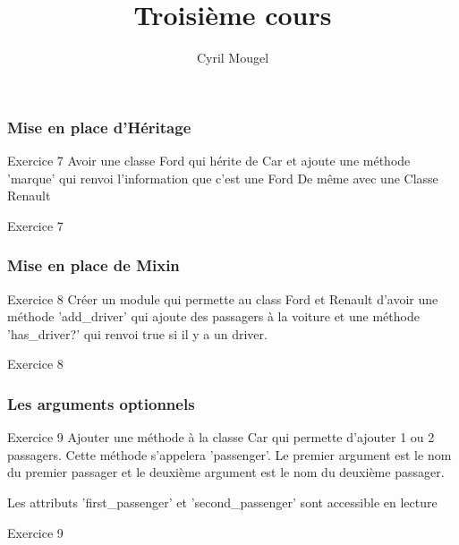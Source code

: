 \documentclass{beamer}
\title{Troisième cours}
\author{Cyril Mougel}
\begin{document}
\begin{frame}
  \titlepage
\end{frame}

\begin{frame}
  \frametitle{Mise en place d'H\'eritage}
  \begin{block}{Exercice 7}
  Avoir une classe Ford qui h\'erite de Car et ajoute une m\'ethode 'marque' qui renvoi l'information que c'est une Ford
  De même avec une Classe Renault
\end{block}
\end{frame}

\begin{frame}
  \begin{beamerboxesrounded}{Exercice 7}
    
  \end{beamerboxesrounded}
\end{frame}

\begin{frame}
  \frametitle{Mise en place de Mixin}
  \begin{block}{Exercice 8}
  Cr\'eer un module qui permette au class Ford et Renault d'avoir une m\'ethode 'add\_driver'
  qui ajoute des passagers à la voiture et une m\'ethode 'has\_driver?' qui renvoi true si il y a un driver.
\end{block}
\end{frame}
\begin{frame}
  \begin{beamerboxesrounded}{Exercice 8}
    
  \end{beamerboxesrounded}
\end{frame}

\begin{frame}
  \frametitle{Les arguments optionnels}
  \begin{block}{Exercice 9}
  Ajouter une m\'ethode à la classe Car qui permette d'ajouter 1 ou 2 passagers. Cette m\'ethode s'appelera 'passenger'. Le premier argument est le nom du premier passager et le deuxième argument est le nom du deuxième passager.

  Les attributs 'first\_passenger' et 'second\_passenger' sont accessible en lecture
\end{block}
\end{frame}

\begin{frame}
  \begin{beamerboxesrounded}{Exercice 9}
    
  \end{beamerboxesrounded}
\end{frame}
\end{document}
